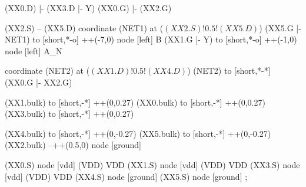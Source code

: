 \begin{circuitikz}[american]
	(XX0.D) |- (XX3.D |- Y)	
	(XX0.G) |- (XX2.G)
	
	(XX2.S) -- (XX5.D)
	coordinate (NET1) at ($(XX2.S)!0.5!(XX5.D)$)
	(XX5.G |- NET1) to [short,*-o] ++(-7,0) node [left] {B}
	(XX1.G |- Y) to [short,*-o] ++(-1,0) node [left] {A\_N}
	
	coordinate (NET2) at ($(XX1.D)!0.5!(XX4.D)$)
	(NET2) to [short,*-*] (XX0.G |- XX2.G)
	
	(XX1.bulk) to [short,-*] ++(0,0.27)
	(XX0.bulk) to [short,-*] ++(0,0.27)
	(XX3.bulk) to [short,-*] ++(0,0.27)

	(XX4.bulk) to [short,-*] ++(0,-0.27)
	(XX5.bulk) to [short,-*] ++(0,-0.27)
	(XX2.bulk) --++(0.5,0) node [ground] {}
	

	(XX0.S) node [vdd] (VDD) {VDD}
	(XX1.S) node [vdd] (VDD) {VDD}
	(XX3.S) node [vdd] (VDD) {VDD}
	(XX4.S) node [ground] {}
	(XX5.S) node [ground] {}
;

\end{circuitikz}
